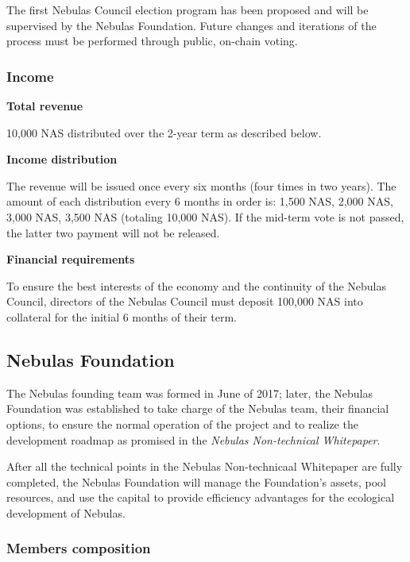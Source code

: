 The first Nebulas Council election program has been proposed and will be supervised by the Nebulas Foundation. Future changes and iterations of the process must be performed through public, on-chain voting.

\subsubsection{Income}

\textbf{Total revenue}

10,000 NAS distributed over the 2-year term as described below.

\vspace{2em}

\textbf{Income distribution}

The revenue will be issued once every six months (four times in two years). The amount of each distribution every 6 months in order is: 1,500 NAS, 2,000 NAS, 3,000 NAS, 3,500 NAS (totaling 10,000 NAS). If the mid-term vote is not passed, the latter two payment will not be released.

\vspace{2em}

\textbf{Financial requirements}

To ensure the best interests of the economy and the continuity of the Nebulas Council, directors of the Nebulas Council must deposit 100,000 NAS into collateral for the initial 6 months of their term.

\vspace{2em}

\subsection{Nebulas Foundation}

The Nebulas founding team was formed in June of 2017; later, the Nebulas Foundation was established to take charge of the Nebulas team, their financial options, to ensure the normal operation of the project and to realize the development roadmap as promised in the \textit{Nebulas Non-technical Whitepaper}.

After all the technical points in the Nebulas Non-technicaal Whitepaper are fully completed, the Nebulas Foundation will manage the Foundation’s assets, pool resources, and use the capital to provide efficiency advantages for the ecological development of Nebulas.

\subsubsection{Members composition}

